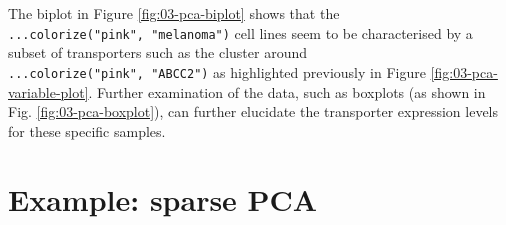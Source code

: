 \documentclass[
]{book}
\newenvironment{Shaded}{\begin{snugshade}}{\end{snugshade}}
\newcommand{\AttributeTok}[1]{\textcolor[rgb]{0.77,0.63,0.00}{#1}}
\newcommand{\CommentTok}[1]{\textcolor[rgb]{0.56,0.35,0.01}{\textit{#1}}}
\newcommand{\ConstantTok}[1]{\textcolor[rgb]{0.00,0.00,0.00}{#1}}
\newcommand{\DecValTok}[1]{\textcolor[rgb]{0.00,0.00,0.81}{#1}}
\newcommand{\FloatTok}[1]{\textcolor[rgb]{0.00,0.00,0.81}{#1}}
\newcommand{\FunctionTok}[1]{\textcolor[rgb]{0.00,0.00,0.00}{#1}}
\newcommand{\NormalTok}[1]{#1}
\newcommand{\OtherTok}[1]{\textcolor[rgb]{0.56,0.35,0.01}{#1}}
\newcommand{\SpecialCharTok}[1]{\textcolor[rgb]{0.00,0.00,0.00}{#1}}
\newcommand{\StringTok}[1]{\textcolor[rgb]{0.31,0.60,0.02}{#1}}
\begin{document}
\begin{Shaded}
\end{Shaded}



The biplot in Figure \ref{fig:03-pca-biplot} shows that the \texttt{...colorize("pink",\ "melanoma")} cell lines seem to be characterised by a subset of transporters such as the cluster around \texttt{...colorize("pink",\ "ABCC2")} as highlighted previously in Figure \ref{fig:03-pca-variable-plot}. Further examination of the data, such as boxplots (as shown in Fig. \ref{fig:03-pca-boxplot}), can further elucidate the transporter expression levels for these specific samples.

\begin{Shaded}
\end{Shaded}



\hypertarget{03:spca}{%
\section{Example: sparse PCA}\label{03:spca}}
\end{document}
